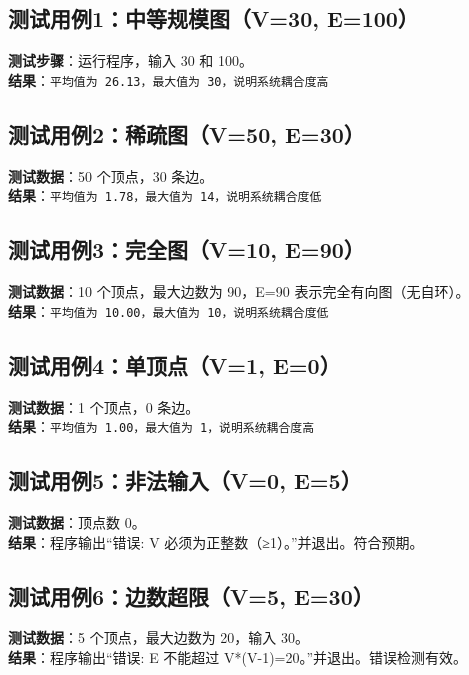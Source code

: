 \documentclass[UTF8]{ctexart}
\begin{document}
\subsection{测试用例1：中等规模图（V=30, E=100）}
\textbf{测试步骤}：运行程序，输入 30 和 100。\\
\textbf{结果}：\texttt{平均值为 26.13，最大值为 30，说明系统耦合度高}

\subsection{测试用例2：稀疏图（V=50, E=30）}
\textbf{测试数据}：50 个顶点，30 条边。\\
\textbf{结果}：\texttt{平均值为 1.78，最大值为 14，说明系统耦合度低}

\subsection{测试用例3：完全图（V=10, E=90）}
\textbf{测试数据}：10 个顶点，最大边数为 90，E=90 表示完全有向图（无自环）。\\
\textbf{结果}：\texttt{平均值为 10.00，最大值为 10，说明系统耦合度低}

\subsection{测试用例4：单顶点（V=1, E=0）}
\textbf{测试数据}：1 个顶点，0 条边。\\
\textbf{结果}：\texttt{平均值为 1.00，最大值为 1，说明系统耦合度高}

\subsection{测试用例5：非法输入（V=0, E=5）}
\textbf{测试数据}：顶点数 0。\\
\textbf{结果}：程序输出“错误: V 必须为正整数（≥1）。”并退出。符合预期。

\subsection{测试用例6：边数超限（V=5, E=30）}
\textbf{测试数据}：5 个顶点，最大边数为 20，输入 30。\\
\textbf{结果}：程序输出“错误: E 不能超过 V*(V-1)=20。”并退出。错误检测有效。
\end{document}
